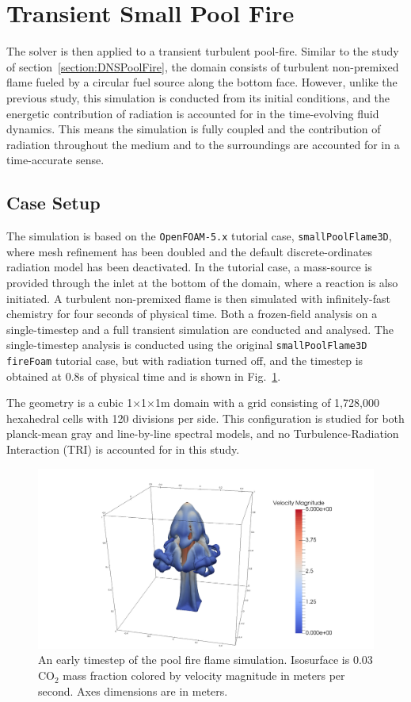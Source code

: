 \section{Transient Small Pool Fire}\label{section:SmallPoolFlame}
The solver is then applied to a transient turbulent pool-fire. Similar to the study of section~\ref{section:DNSPoolFire}, the domain consists of turbulent non-premixed flame fueled by a circular fuel source along the bottom face. However, unlike the previous study, this simulation is conducted from its initial conditions, and the energetic contribution of radiation is accounted for in the time-evolving fluid dynamics. This means the simulation is fully coupled and the contribution of radiation throughout the medium and to the surroundings are accounted for in a time-accurate sense. 

\subsection{Case Setup}
The simulation is based on the \verb|OpenFOAM-5.x| tutorial case, \texttt{smallPoolFlame3D}, where mesh refinement has been doubled and the default discrete-ordinates radiation model has been deactivated. 
In the tutorial case, a mass-source is provided through the inlet at the bottom of the domain, where a reaction is also initiated. A turbulent non-premixed flame is then simulated with infinitely-fast chemistry for four seconds of physical time.
Both a frozen-field analysis on a single-timestep and a full transient simulation are conducted and analysed. The single-timestep analysis is conducted using the original \texttt{smallPoolFlame3D} \verb|fireFoam| tutorial case, but with radiation turned off, and the timestep is obtained at 0.8s of physical time and is shown in Fig.~\ref{fig:PoolFire_diagram}.

The geometry is a cubic 1$\times$1$\times$1m domain with a grid consisting of 1,728,000 hexahedral cells with 120 divisions per side.
This configuration is studied for both planck-mean gray and line-by-line spectral models, and no Turbulence-Radiation Interaction (TRI) is accounted for in this study. %

\begin{figure}
\includegraphics[width=\linewidth]{figures/ch4/contour_early.png}
\caption{An early timestep of the pool fire flame simulation. Isosurface is 0.03 CO$_2$ mass fraction colored by velocity magnitude in meters per second. Axes dimensions are in meters.}
\label{fig:PoolFire_diagram}
\end{figure}

